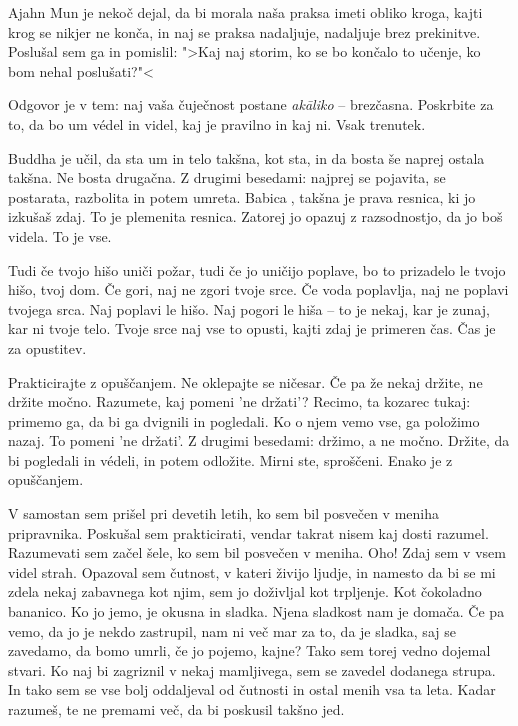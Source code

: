 Ajahn Mun je nekoč dejal, da bi morala naša praksa imeti obliko kroga, kajti krog se nikjer ne konča, in naj se praksa nadaljuje, nadaljuje brez prekinitve. Poslušal sem ga in pomislil: ">Kaj naj storim, ko se bo končalo to učenje, ko bom nehal poslušati?"<

Odgovor je v tem: naj vaša čuječnost postane \emph{akāliko} – brezčasna. Poskrbite za to, da bo um védel in videl, kaj je pravilno in kaj ni. Vsak trenutek.

\clearpage


Buddha je učil, da sta um in telo takšna, kot sta, in da bosta še naprej ostala takšna. Ne bosta drugačna. Z drugimi besedami: najprej se pojavita, se postarata, razbolita in potem umreta. Babica, takšna je prava resnica, ki jo izkušaš zdaj. To je plemenita resnica. Zatorej jo opazuj z razsodnostjo, da jo boš videla. To je vse.

Tudi če tvojo hišo uniči požar, tudi če jo uničijo poplave, bo to prizadelo le tvojo hišo, tvoj dom. Če gori, naj ne zgori tvoje srce. Če voda poplavlja, naj ne poplavi tvojega srca. Naj poplavi le hišo. Naj pogori le hiša – to je nekaj, kar je zunaj, kar ni tvoje telo. Tvoje srce naj vse to opusti, kajti zdaj je primeren čas. Čas je za opustitev.


Prakticirajte z opuščanjem. Ne oklepajte se ničesar. Če pa že nekaj držite, ne držite močno. Razumete, kaj pomeni 'ne držati'? Recimo, ta kozarec tukaj: primemo ga, da bi ga dvignili in pogledali. Ko o njem vemo vse, ga položimo nazaj. To pomeni 'ne držati'. Z drugimi besedami: držimo, a ne močno. Držite, da bi pogledali in védeli, in potem odložite. Mirni ste, sproščeni. Enako je z opuščanjem.

\clearpage


V samostan sem prišel pri devetih letih, ko sem bil posvečen v meniha pripravnika. Poskušal sem prakticirati, vendar takrat nisem kaj dosti razumel. Razumevati sem začel šele, ko sem bil posvečen v meniha. Oho! Zdaj sem v vsem videl strah. Opazoval sem čutnost, v kateri živijo ljudje, in namesto da bi se mi zdela nekaj zabavnega kot njim, sem jo doživljal kot trpljenje. Kot čokoladno bananico. Ko jo jemo, je okusna in sladka. Njena sladkost nam je domača. Če pa vemo, da jo je nekdo zastrupil, nam ni več mar za to, da je sladka, saj se zavedamo, da bomo umrli, če jo pojemo, kajne? Tako sem torej vedno dojemal stvari. Ko naj bi zagriznil v nekaj mamljivega, sem se zavedel dodanega strupa. In tako sem se vse bolj oddaljeval od čutnosti in ostal menih vsa ta leta. Kadar razumeš, te ne premami več, da bi poskusil takšno jed.

